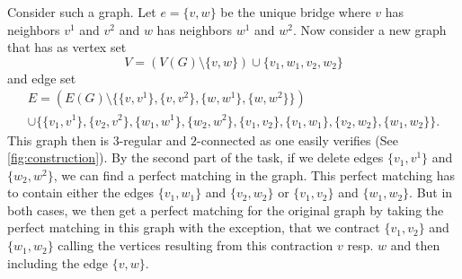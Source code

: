 \documentclass{scrartcl}
\begin{document}
\begin{enumerate}
Consider such a graph. Let $e=\{v,w\}$ be the unique bridge where $v$ has neighbors $v^1$ and $v^2$ and $w$ has neighbors $w^1$ and $w^2$. Now consider a new graph that has as vertex set
\[
V = (V(G) \setminus \{v,w\})\cup \{v_1, w_1, v_2, w_2\}
\]
and edge set 
\begin{multline*}
E = (E(G) \setminus \{\{v,v^1\},\{v,v^2\},\{w,w^1\},\{w,w^2\}\})\\ \cup \{\{v_1,v^1\},\{v_2,v^2\},\{w_1,w^1\},\{w_2,w^2\},\{v_1,v_2\},\{v_1,w_1\},\{v_2,w_2\},\{w_1,w_2\}\}.
\end{multline*}
This graph then is $3$-regular and $2$-connected as one easily verifies (See \autoref{fig:construction}). By the second part of the task, if we delete edges $\{v_1,v^1\}$ and $\{w_2,w^2\}$, we can find a perfect matching in the graph. This perfect matching has to contain either the edges $\{v_1,w_1\}$ and $\{v_2,w_2\}$ or $\{v_1, v_2\}$ and $\{w_1, w_2\}$. But in both cases, we then get a perfect matching for the original graph by taking the perfect matching in this graph with the exception, that we contract $\{v_1, v_2\}$ and $\{w_1, w_2\}$ calling the vertices resulting from this contraction $v$ resp. $w$ and then including the edge $\{v,w\}$. 

\begin{figure}
\begin{subfigure}[c]{.5\linewidth}
\centering
{}
\end{subfigure}
\end{figure}
\end{enumerate}
\end{document}
